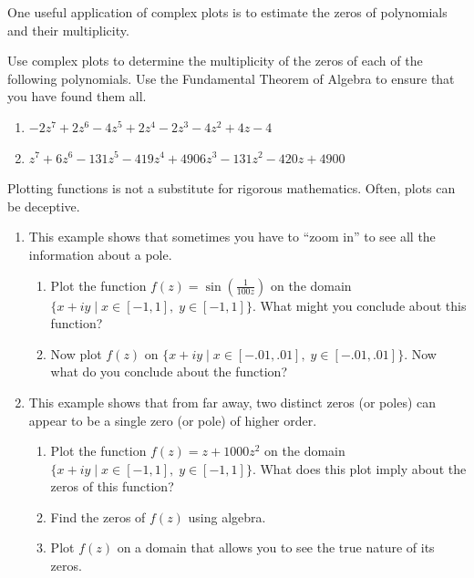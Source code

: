 One useful application of complex plots is to estimate the zeros of polynomials and their multiplicity.

\begin{problem}\label{prob:find_roots}
Use complex plots to determine the multiplicity of the zeros of each of the following polynomials.
Use the Fundamental Theorem of Algebra to ensure that you have found them all.
\begin{enumerate}
\item $-2z^7+2z^6-4z^5+2z^4-2z^3-4z^2+4z-4$
\item $z^7 + 6z^6 - 131z^5 - 419z^4 + 4906z^3 - 131z^2 - 420z + 4900$
\end{enumerate}
\end{problem}

Plotting functions is not a substitute for rigorous mathematics. 
Often, plots can be deceptive.

\begin{problem}\label{prob:caution}
\leavevmode
\begin{enumerate}
\item This example shows that sometimes you have to ``zoom in'' to see all the information about a pole.
\begin{enumerate}
\item Plot the function $f(z) =\sin( \frac{1}{100z})$ on the domain $\{x+iy \mid x \in [-1,1],\; y \in [-1,1]\}$.
What might you conclude about this function?
\item Now plot $f(z)$ on $\{x+iy \mid x \in [-.01,.01], \; y \in [-.01,.01]\}$.
Now what do you conclude about the function?
\end{enumerate}
\item This example shows that from far away, two distinct zeros (or poles) can appear to be a single zero (or pole) of higher order.
\begin{enumerate}
\item Plot the function $f(z) = z+1000z^2$ on the domain $\{x+iy \mid x \in [-1,1], \; y \in [-1,1]\}$.
What does this plot imply about the zeros of this function?
\item Find the zeros of $f(z)$ using algebra.
\item Plot $f(z)$ on a domain that allows you to see the true nature of its zeros.
\end{enumerate}
\end{enumerate}
\end{problem}




















